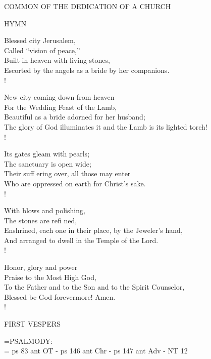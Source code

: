 \begin{center}\normalsize COMMON OF THE DEDICATION OF A CHURCH\\
\end{center}

\noindent\small{\uppercase{Hymn}}\normalsize\label{commons:dedication}
\begin{cverse}
Blessed city Jerusalem,\\
Called “vision of peace,”\\
Built in heaven with living stones,\\
Escorted by the angels as a bride by her companions.\\!

New city coming down from heaven\\
For the Wedding Feast of the Lamb,\\
Beautiful as a bride adorned for her husband;\\
The glory of God illuminates it and the Lamb is its lighted torch!\\!

Its gates gleam with pearls;\\
The sanctuary is open wide;\\
Their suff ering over, all those may enter\\
Who are oppressed on earth for Christ’s sake.\\!

With blows and polishing,\\
The stones are refi ned,\\
Enshrined, each one in their place, by the Jeweler’s hand,\\
And arranged to dwell in the Temple of the Lord.\\!

Honor, glory and power\\
Praise to the Most High God,\\
To the Father and to the Son and to the Spirit Counselor,\\
Blessed be God forevermore! Amen.\\!
\end{cverse}

\begin{flushleft}\normalsize FIRST VESPERS\\\end{flushleft}

\hangindent=\parindent \small{PSALMODY:}\\
\hangindent=\parindent \vspace{0.5em}
ps 83 ant OT - ps 146 ant Chr - ps 147 ant Adv - NT 12

